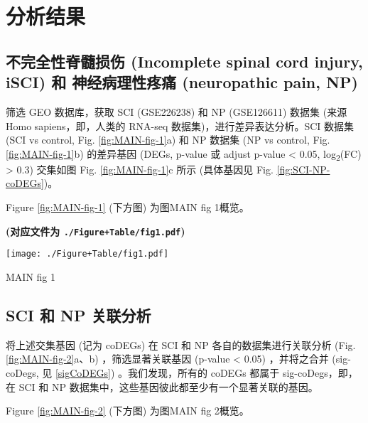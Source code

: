 \documentclass[
]{article}
\begin{document}
\hypertarget{results}{%
\section{分析结果}\label{results}}

\hypertarget{ux4e0dux5b8cux5168ux6027ux810aux9ad3ux635fux4f24-incomplete-spinal-cord-injury-isci-ux548c-ux795eux7ecfux75c5ux7406ux6027ux75bcux75db-neuropathic-pain-np}{%
\subsection{不完全性脊髓损伤 (Incomplete spinal cord injury, iSCI) 和 神经病理性疼痛 (neuropathic pain, NP)}\label{ux4e0dux5b8cux5168ux6027ux810aux9ad3ux635fux4f24-incomplete-spinal-cord-injury-isci-ux548c-ux795eux7ecfux75c5ux7406ux6027ux75bcux75db-neuropathic-pain-np}}

筛选 GEO 数据库，获取 SCI (GSE226238) 和 NP (GSE126611) 数据集 (来源 Homo sapiens，即，人类的 RNA-seq 数据集)，进行差异表达分析。SCI 数据集 (SCI vs control, Fig. \ref{fig:MAIN-fig-1}a) 和 NP 数据集 (NP vs control, Fig. \ref{fig:MAIN-fig-1}b) 的差异基因 (DEGs, p-value 或 adjust p-value \textless{} 0.05, \textbar log\textsubscript{2}(FC)\textbar{} \textgreater{} 0.3) 交集如图 Fig. \ref{fig:MAIN-fig-1}c 所示 (具体基因见 Fig. \ref{fig:SCI-NP-coDEGs})。

Figure \ref{fig:MAIN-fig-1} (下方图) 为图MAIN fig 1概览。

\textbf{(对应文件为 \texttt{./Figure+Table/fig1.pdf})}

\def\@captype{figure}
\begin{center}
\texttt{[image: ./Figure+Table/fig1.pdf]}
\caption{MAIN fig 1}\label{fig:MAIN-fig-1}
\end{center}

\hypertarget{sci-ux548c-np-ux5173ux8054ux5206ux6790}{%
\subsection{SCI 和 NP 关联分析}\label{sci-ux548c-np-ux5173ux8054ux5206ux6790}}

将上述交集基因 (记为 coDEGs) 在 SCI 和 NP 各自的数据集进行关联分析 (Fig. \ref{fig:MAIN-fig-2}a、b) ，筛选显著关联基因 (p-value \textless{} 0.05) ，并将之合并 (sig-coDegs, 见 \ref{sigCoDEGs}) 。我们发现，所有的 coDEGs 都属于 sig-coDegs，即，在 SCI 和 NP 数据集中，这些基因彼此都至少有一个显著关联的基因。

Figure \ref{fig:MAIN-fig-2} (下方图) 为图MAIN fig 2概览。
\end{document}
